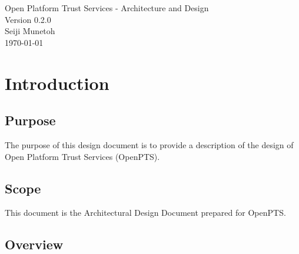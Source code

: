 \documentclass[12pt,a4paper]{article}
\begin{document}
 

\begin{titlepage}
\vspace*{7cm}
\begin{center}
{\Large Open Platform Trust Services - Architecture and Design \\[1ex]\large Version 0.2.0 }\\
\vspace*{1cm}
{\large Seiji Munetoh}\\
\vspace*{0.5cm}
{\small \today}\\

\end{center}
\end{titlepage}


{}


\tableofcontents

\clearpage 
{}

\section{Introduction} 

\subsection{Purpose} 

The purpose of this design document is to provide a description of
the design of Open Platform Trust Services (OpenPTS).

\subsection{Scope} 

This document is the Architectural Design Document prepared for OpenPTS.

\subsection{Overview}
\end{document}

